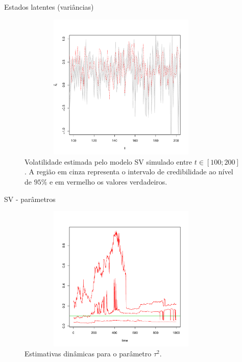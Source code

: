 \documentclass{beamer}
\begin{document}
\begin{frame}{Estados latentes (variâncias)}


\begin{figure}
\begin{center}
 \includegraphics[height=7cm,width =10cm]{processo_1_01_02_05.pdf}
 \end{center}
\caption{Volatilidade estimada pelo modelo SV simulado entre $t \in [100 ;200]$. A região em cinza representa o intervalo de credibilidade ao nível de $95\%$ e em vermelho os valores verdadeiros.} 
\end{figure}

 \end{frame}
 
 
 \begin{frame}{SV - parâmetros}

 
 \begin{figure}
\begin{center}
 \includegraphics[height=7cm,width =10cm]{tau_1_01_02_05.pdf}
 \end{center}
\caption{ Estimativas dinâmicas para o parâmetro $\tau^2$.} 
\end{figure}

 \end{frame}
 
\end{document}
